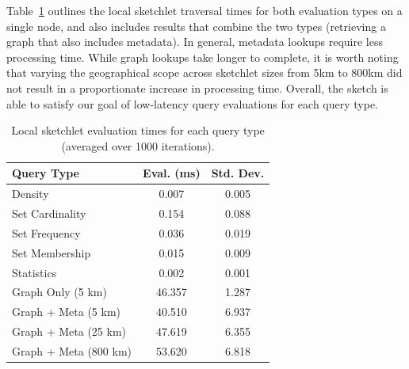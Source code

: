Table~\ref{tbl:query-times} outlines the local sketchlet traversal times for both evaluation types on a single node, and also includes results that combine the two types (retrieving a graph that also includes metadata). In general, metadata lookups require less processing time. While graph lookups take longer to complete, it is worth noting that varying the geographical scope across sketchlet sizes from 5km to 800km did not result in a proportionate increase in processing time. Overall, the sketch is able to satisfy our goal of low-latency query evaluations for each query type.

\begin{table}[h!]
    \renewcommand{\arraystretch}{1.4}
    \caption{Local sketchlet evaluation times for each query type (averaged over 1000 iterations).}
    \label{tbl:query-times}
    \begin{center}
        \begin{tabular}{|l|c|c|}
            \hline
            \textbf{Query Type}      & \textbf{Eval. (ms)} & \textbf{Std. Dev.} \\
            \hline
            Density                  & 0.007                    & 0.005 \\
            \hline
            Set Cardinality          & 0.154                    & 0.088 \\
            \hline
            Set Frequency            & 0.036                    & 0.019 \\
            \hline
            Set Membership           & 0.015                    & 0.009 \\
            \hline
            Statistics               & 0.002                    & 0.001 \\
            \hline
            \hline
            Graph Only (5 km)        & 46.357                   & 1.287 \\
            \hline
            Graph + Meta (5 km)      & 40.510                   & 6.937 \\
            \hline
            Graph + Meta (25 km)     & 47.619                   & 6.355 \\
            \hline
            Graph + Meta (800 km)    & 53.620                   & 6.818 \\
            \hline
        \end{tabular}
    \end{center}
\end{table}
